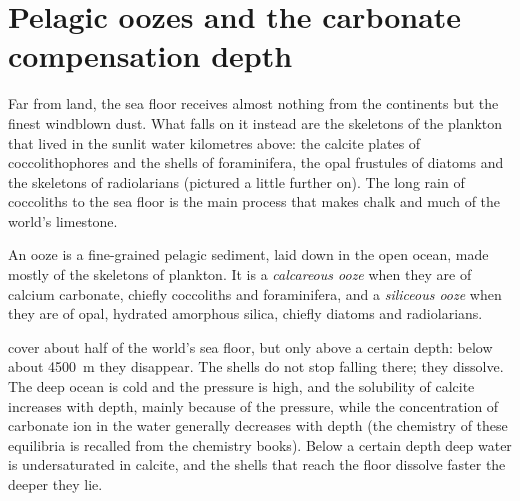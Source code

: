 \section{Pelagic oozes and the carbonate compensation depth}\label{sec:b1:chemical-biogenic-sediments:oozes}

Far from land, the sea floor receives almost nothing from the continents but
the finest windblown dust. What falls on it instead are the skeletons of the
plankton that lived in the sunlit water kilometres above: the calcite plates of
coccolithophores and the shells of foraminifera, the opal frustules of diatoms
and the skeletons of radiolarians
(pictured a little further on). The long rain of coccoliths
to the sea floor is the main process that makes chalk and much of the
world's limestone.

\begin{definition}\label{def:b1:chemical-biogenic-sediments:ooze}
An ooze is a fine-grained pelagic sediment, laid down in the open ocean, made
mostly of the skeletons of plankton. It is a \emph{calcareous
ooze} when they are of calcium carbonate, chiefly
coccoliths and foraminifera, and a \emph{siliceous ooze}
when they are of opal, hydrated amorphous silica, chiefly diatoms and
radiolarians.
\end{definition}

 cover about half of the world's sea floor, but only above a
certain depth: below about \qty{4500}{m} they disappear. The shells do not stop
falling there; they dissolve. The deep ocean is cold and the pressure is high,
and the solubility of calcite increases with depth, mainly because of the
pressure, while the concentration of carbonate ion in the water generally
decreases with depth (the chemistry of these equilibria is recalled from the
chemistry books). Below a certain depth deep water is undersaturated in calcite,
and the shells that reach the floor dissolve faster the deeper they lie.

